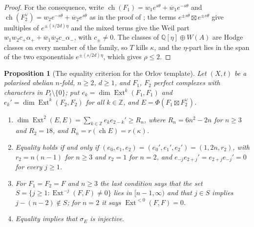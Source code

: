 \documentclass[11pt,reqno]{amsart}
\theoremstyle{plain}
\newtheorem{proposition}[theorem]{Proposition}
\theoremstyle{definition}
\theoremstyle{remark}
\newcommand{\QQ}{\mathbb{Q}}
\newcommand{\ZZ}{\mathbb{Z}}
\newcommand{\HW}{W}                      %
\DeclareMathOperator{\ch}{ch}
\DeclareMathOperator{\Ext}{Ext}
\newcommand{\bbar}[1]{\overline{#1}}
\begin{document}
\begin{proof}
For the consequence, write
$\ch(F_{1})=w_{1}e^{s\theta}+\bbar w_{1}e^{-s\theta}$ and
$\ch(F_{2}^{\vee})=w_{2}e^{-s\theta}+\bbar w_{2}e^{s\theta}$ as in the proof of
; the terms $e^{\pm s\theta}\boxtimes e^{\pm s\theta}$
give multiples of $e^{\pm(s/2d)\eta}$ and the mixed terms give the Weil part
$w_{1}w_{2}c_{+}\alpha_{+}+\bbar w_{1}\bbar w_{2}c_{-}\alpha_{-}$, with
$c_{\pm}\ne0$. The classes of $\QQ[\eta]\oplus\HW(A)$ are Hodge classes on
every member of the family, so $T$ kills $\kappa$, and the $\eta$-part lies in
the span of the two exponentials $e^{\pm(s/2d)\eta}$, which gives $\rho\le2$.
\end{proof}

\begin{proposition}[The equality criterion for the Orlov template]
\label{prop:orlovequality}
Let $(X,t)$ be a polarised abelian $n$-fold, $n\ge2$, $d\ge1$, and $F_{1}$,
$F_{2}$ perfect complexes with characters in $P_{t}\setminus\{0\}$; put
$e_{k}=\dim\Ext^{k}(F_{1},F_{1})$ and $e_{k}'=\dim\Ext^{k}(F_{2},F_{2})$ for all
$k\in\ZZ$, and $E=\Phi(F_{1}\boxtimes F_{2}^{\vee})$.
\begin{enumerate}[label=\textup{(\roman*)},leftmargin=2.6em,itemsep=2pt]
\item $\dim\Ext^{2}(E,E)=\sum_{k\in\ZZ}e_{k}e_{2-k}'\ge R_{n}$, where
  $R_{n}=6n^{2}-2n$ for $n\ge3$ and $R_{2}=18$, and $R_{n}=r(\ch E)=r(\kappa)$.
\item Equality holds if and only if $(e_{0},e_{1},e_{2})=(e_{0}',e_{1}',e_{2}')
  =(1,2n,r_{2})$, with $r_{2}=n(n-1)$ for $n\ge3$ and $r_{2}=1$ for $n=2$, and
  $e_{-j}e_{2+j}'=e_{2+j}e_{-j}'=0$ for every $j\ge1$.
\item For $F_{1}=F_{2}=F$ and $n\ge3$ the last condition says that the set
  $S=\{j\ge1:\Ext^{-j}(F,F)\ne0\}$ lies in $[n-1,\infty)$ and that $j\in S$
  implies $j-(n-2)\notin S$; for $n=2$ it says $\Ext^{<0}(F,F)=0$.
\item Equality implies that $\sigma_{E}$ is injective.
\end{enumerate}
\end{proposition}
\end{document}
